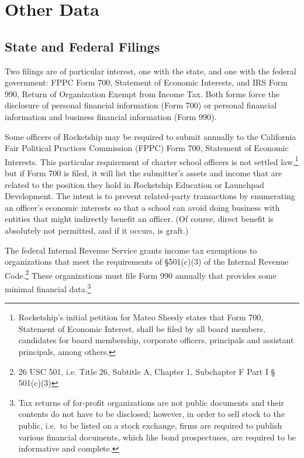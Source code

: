 \section{Other Data}\label{other-data}%

\subsection{State and Federal Filings}\label{sec:state-federal-filings}%

Two filings are of particular interest, one with the state, and one with the federal government: FPPC Form 700, Statement of Economic Interests, and IRS Form 990, Return of Organization Exempt from Income Tax. Both forms force the disclosure of personal financial information (Form 700) or personal financial information and business financial information (Form 990). 

Some officers of Rocketship may be required to submit annually to the California Fair Political Practices Commission (FPPC) Form 700, Statement of Economic Interests. This particular requirement of charter school officers is not settled law,\footnote{Rocketship's initial petition for Mateo Sheedy states that Form 700, Statement of Economic Interest, shall be filed by all board members, candidates for board membership, corporate officers, principals and assistant principals, among others.} but if Form 700 is filed, it will list the submitter's assets and income that are related to the position they hold in Rocketship Education or Launchpad Development. The intent is to prevent related-party transactions by enumerating an officer's economic interests so that a school can avoid doing business with entities that might indirectly benefit an officer. (Of course, direct benefit is absolutely not permitted, and if it occurs, is graft.)  

The federal Internal Revenue Service grants income tax exemptions to organizations that meet the requirements of §501(c)(3) of the  Internal Revenue Code.\footnote{26 USC 501, i.e. Title 26, Subtitle A, Chapter 1, Subchapter F Part I § 501(c)(3)} These organizations must file Form 990 annually that provides some minimal financial data.\footnote{Tax returns of for-profit organizations are not public documents and their contents do not have to be disclosed; however, in order to sell stock to the public, i.e.~to be listed on a stock exchange, firms are required to publish various financial documents, which like bond prospectuses, are required to be informative and complete.} %


